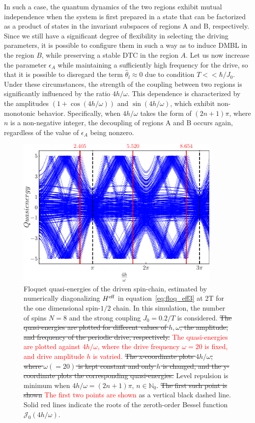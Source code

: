\documentclass[12pt]{iopart}
\newcommand{\red}[1]{\textcolor{red}{#1}}
\begin{document}
In such a case, the quantum dynamics of the two regions exhibit mutual independence when the system is first prepared in a state that can be factorized as a product of states in the invariant subspaces of regions A and B, respectively. Since we still have a significant degree of flexibility in selecting the driving parameters, it is possible to configure them in such a way as to induce DMBL in the region $B$, while preserving a stable DTC in the region $A$. Let us now increase the parameter $\epsilon_A$ while maintaining a sufficiently high frequency for the drive, so that it is possible to disregard the term $\hat{\theta}_l \approx 0$ due to condition $T<<\hbar/J_0$. Under these circumstances, the strength of the coupling between two regions is significantly influenced by the ratio $4h/\omega$. This dependence is characterized by the amplitudes $(1+\cos(4h/\omega))$ and $\sin(4h/\omega)$, which exhibit non-monotonic behavior. Specifically, when $4h/\omega$ takes the form of $(2n+1)\pi$, where $n$ is a non-negative integer, the decoupling of regions A and B occurs again, regardless of the value of $\epsilon_A$ being nonzero.
\begin{figure}[h!]
    \centering
    \includegraphics[width=10cm]{figure3.pdf}
    \caption{Floquet quasi-energies of the driven spin-chain,  estimated by numerically diagonalizing $H^{\rm eff}$ in equation~\eqref{eq:floq_eff3} at 2T for the one dimensional spin-$1/2$ chain. In this simulation, the number of spins $N=8$ and the strong coupling $J_0=0.2/T$ is considered. \sout{The quasi-energies are plotted for different values of $h,\omega$, the amplitude, and frequency of the periodic drive, respectively.} \red{The quasi-energies are plotted against $4h/\omega$, where the drive frequency $\omega=20$ is fixed, and drive amplitude $h$ is vatried.} \sout{The x-coordinate plots ${4h}/{\omega}$, where $\omega( = 20)$ is kept constant and only $h$ is changed, and the y-coordinate plots the corresponding quasi-energies.}  Level repulsion is minimum when ${4h}/{\omega} = (2n+1)\pi$, $n\in \mathbb{N}_0$. \sout{The first such point is shown}\red{ The first two points are shown} as a vertical black dashed line. Solid red lines indicate the roots of the zeroth-order Bessel function $\mathcal{J}_0(4h/\omega)$.}
    \label{Fig:quasienergy_new}
\end{figure}	
\end{document}
